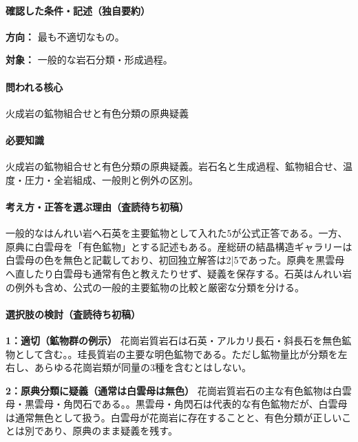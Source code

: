 \paragraph{確認した条件・記述（独自要約）}\mbox{}\par

\noindent\textbf{方向：} 最も不適切なもの。\par

\noindent\textbf{対象：} 一般的な岩石分類・形成過程。\par

\paragraph{問われる核心} 火成岩の鉱物組合せと有色分類の原典疑義

\paragraph{必要知識} 火成岩の鉱物組合せと有色分類の原典疑義。岩石名と生成過程、鉱物組合せ、温度・圧力・全岩組成、一般則と例外の区別。

\paragraph{考え方・正答を選ぶ理由（査読待ち初稿）} 一般的なはんれい岩へ石英を主要鉱物として入れた5が公式正答である。一方、原典に白雲母を「有色鉱物」とする記述もある。産総研の結晶構造ギャラリーは白雲母の色を無色と記載しており、初回独立解答は2|5であった。原典を黒雲母へ直したり白雲母も通常有色と教えたりせず、疑義を保存する。石英はんれい岩の例外も含め、公式の一般的主要鉱物の比較と厳密な分類を分ける。

\paragraph{選択肢の検討（査読待ち初稿）}\mbox{}\par

\noindent\textbf{1：適切（鉱物群の例示）} 花崗岩質岩石は石英・アルカリ長石・斜長石を無色鉱物として含む。。珪長質岩の主要な明色鉱物である。ただし鉱物量比が分類を左右し、あらゆる花崗岩類が同量の3種を含むとはしない。\par

\noindent\textbf{2：原典分類に疑義（通常は白雲母は無色）} 花崗岩質岩石の主な有色鉱物は白雲母・黒雲母・角閃石である。。黒雲母・角閃石は代表的な有色鉱物だが、白雲母は通常無色として扱う。白雲母が花崗岩に存在することと、有色分類が正しいことは別であり、原典のまま疑義を残す。\par

